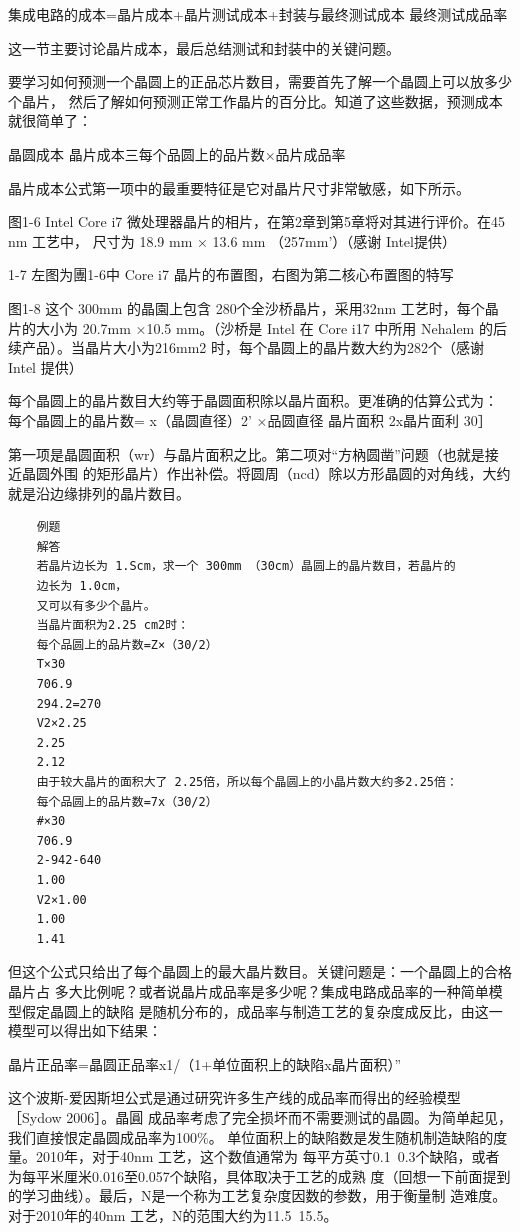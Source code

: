 集成电路的成本=晶片成本+晶片测试成本+封装与最终测试成本
最终测试成品率

这一节主要讨论晶片成本，最后总结测试和封装中的关键问题。

要学习如何预测一个晶圆上的正品芯片数目，需要首先了解一个晶圆上可以放多少个晶片，
然后了解如何预测正常工作晶片的百分比。知道了这些数据，预测成本就很简单了：

晶圆成本
晶片成本三每个品圆上的品片数×品片成品率

晶片成本公式第一项中的最重要特征是它对晶片尺寸非常敏感，如下所示。

图1-6 Intel Core i7 微处理器晶片的相片，在第2章到第5章将对其进行评价。在45 nm 工艺中，
尺寸为 18.9 mm × 13.6 mm （257mm’）（感谢 Intel提供）

1-7 左图为團1-6中 Core i7 晶片的布置图，右图为第二核心布置图的特写

图1-8 这个 300mm 的晶園上包含 280个全沙桥晶片，采用32nm 工艺时，每个晶片的大小为
20.7mm ×10.5 mm。（沙桥是 Intel 在 Core i17 中所用 Nehalem 的后续产品）。当晶片大小为216mm2
时，每个晶圆上的晶片数大约为282个（感谢 Intel 提供）

每个晶圆上的晶片数目大约等于晶圆面积除以晶片面积。更准确的估算公式为：
每个晶圆上的晶片数= x（晶圆直径）2’
×品圆直径
晶片面积
2x晶片面利
30］

第一项是晶圆面积（wr）与晶片面积之比。第二项对“方枘圆凿”问题（也就是接近晶圆外围
的矩形晶片）作出补偿。将圆周（ncd）除以方形晶圆的对角线，大约就是沿边缘排列的晶片数目。

\begin{verbatim}
    例题
    解答
    若晶片边长为 1.Scm，求一个 300mm （30cm）晶圆上的晶片数目，若晶片的
    边长为 1.0cm，
    又可以有多少个晶片。
    当晶片面积为2.25 cm2时：
    每个品圆上的品片数=Z×（30/2）
    T×30
    706.9
    294.2=270
    V2×2.25
    2.25
    2.12
    由于较大晶片的面积大了 2.25倍，所以每个晶圆上的小晶片数大约多2.25倍：
    每个品圆上的品片数=7x（30/2）
    #×30
    706.9
    2-942-640
    1.00
    V2×1.00
    1.00
    1.41
\end{verbatim}

但这个公式只给出了每个晶圆上的最大晶片数目。关键问题是：一个晶圆上的合格晶片占
多大比例呢？或者说晶片成品率是多少呢？集成电路成品率的一种简单模型假定晶圆上的缺陷
是随机分布的，成品率与制造工艺的复杂度成反比，由这一模型可以得出如下结果：

晶片正品率=晶圆正品率x1/（1+单位面积上的缺陷x晶片面积）”

这个波斯-爱因斯坦公式是通过研究许多生产线的成品率而得出的经验模型［Sydow 2006］。晶圓
成品率考虑了完全损坏而不需要测试的晶圆。为简单起见，我们直接恨定晶圆成品率为100\%。
单位面积上的缺陷数是发生随机制造缺陷的度量。2010年，对于40nm 工艺，这个数值通常为
每平方英寸0.1~0.3个缺陷，或者为每平米厘米0.016至0.057个缺陷，具体取决于工艺的成熟
度（回想一下前面提到的学习曲线）。最后，N是一个称为工艺复杂度因数的参数，用于衡量制
造难度。对于2010年的40nm 工艺，N的范围大约为11.5~15.5。

